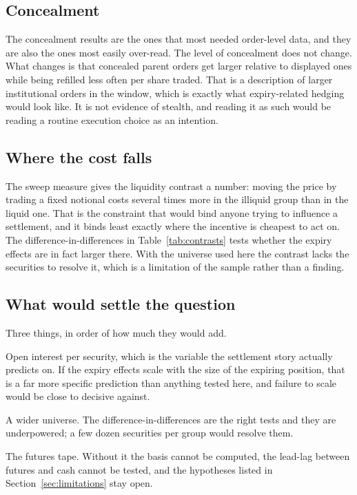 \subsection{Concealment}

The concealment results are the ones that most needed order-level data, and they are also the
ones most easily over-read. The level of concealment does not change. What changes is that
concealed parent orders get larger relative to displayed ones while being refilled less often
per share traded. That is a description of larger institutional orders in the window, which
is exactly what expiry-related hedging would look like. It is not evidence of stealth, and
reading it as such would be reading a routine execution choice as an intention.

\subsection{Where the cost falls}

The sweep measure gives the liquidity contrast a number: moving the price by trading a fixed
notional costs several times more in the illiquid group than in the liquid one. That is the
constraint that would bind anyone trying to influence a settlement, and it binds least
exactly where the incentive is cheapest to act on. The difference-in-differences in
Table~\ref{tab:contrasts} tests whether the expiry effects are in fact larger there. With the
universe used here the contrast lacks the securities to resolve it, which is a limitation of
the sample rather than a finding.

\subsection{What would settle the question}

Three things, in order of how much they would add.

Open interest per security, which is the variable the settlement story actually predicts on.
If the expiry effects scale with the size of the expiring position, that is a far more
specific prediction than anything tested here, and failure to scale would be close to
decisive against.

A wider universe. The difference-in-differences are the right tests and they are
underpowered; a few dozen securities per group would resolve them.

The futures tape. Without it the basis cannot be computed, the lead-lag between futures and
cash cannot be tested, and the hypotheses listed in Section~\ref{sec:limitations} stay open.
